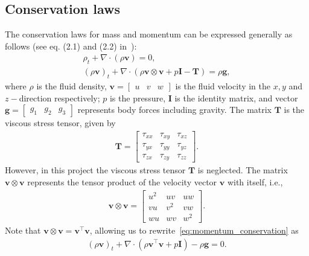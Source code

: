 \subsection{Conservation laws}
The conservation laws for mass and momentum can be expressed generally as follows (see eq. (2.1) and (2.2) in~\cite{Toro2001-Shock}):
\begin{align}
    \rho_t + \nabla \cdot (\rho \mathbf{v}) = 0, \label{eq:mass_conservation} \\
    {(\rho \mathbf{v})}_t + \nabla \cdot (\rho \mathbf{v} \otimes \mathbf{v} + p \mathbf{I} - \mathbf{T}) = \rho \mathbf{g}, \label{eq:momentum_conservation}
\end{align}
where $\rho$ is the fluid density, $\mathbf{v} = \begin{bmatrix} u & v & w \end{bmatrix} $ is the fluid velocity in the $x, y$ and $z-$direction respectively;
$p$ is the pressure, $\mathbf{I}$ is the identity matrix, and vector $\mathbf{g} = \begin{bmatrix}
    g_1 & g_2 & g_3
\end{bmatrix}$ represents body forces including gravity.
The matrix $\mathbf{T}$ is the viscous stress tensor, given by
\begin{align*}
    \mathbf{T} = \begin{bmatrix}
        \tau_{xx} & \tau_{xy} & \tau_{xz} \\
        \tau_{yx} & \tau_{yy} & \tau_{yz} \\
        \tau_{zx} & \tau_{zy} & \tau_{zz}
    \end{bmatrix}.
\end{align*}
However, in this project the viscous stress tensor $\mathbf{T}$ is neglected.
The matrix $\mathbf{v} \otimes \mathbf{v}$ represents the tensor product of the velocity vector $\mathbf{v}$ with itself, i.e.,
\begin{align*}
    \mathbf{v} \otimes \mathbf{v} = \begin{bmatrix}
        u^2 & uv & uw \\
        vu & v^2 & vw \\
        wu & wv & w^2
    \end{bmatrix}.
\end{align*}
Note that $\mathbf{v} \otimes \mathbf{v} = \mathbf{v}^\top \mathbf{v}$, allowing us to rewrite~\eqref{eq:momentum_conservation} as 
\begin{align}\label{eq:momentum_conservation_simplified}
    {(\rho \mathbf{v})}_t + \nabla \cdot (\rho \mathbf{v}^\top \mathbf{v} + p \mathbf{I}) - \rho \mathbf{g} = 0.
\end{align}
